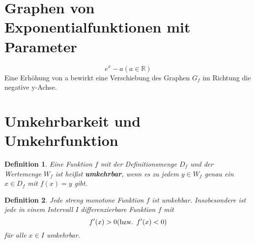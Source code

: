 \documentclass{book}
\newtheorem{definition}{Definition}
\begin{document}
\section{Graphen von Exponentialfunktionen mit Parameter}
\[e^x - a (a\in \mathbb{R})\]
Eine Erhöhung von a bewirkt eine Verschiebung des Graphen $G_f$ im Richtung die negative y-Achse.

\section{Umkehrbarkeit und Umkehrfunktion}

\begin{definition}
Eine Funktion $f$ mit der Definitionsmenge $D_f$ und der Wertemenge $W_f$ ist heißst \textbf{umkehrbar}, wenn es zu jedem $ y \in W_f$ genau ein $x \in D_f$ mit $ f(x) = y$ gibt.
\end{definition}

\begin{definition}
Jede streng monotone Funktion $f$ ist umkehbar.
Insobesondere ist jede in einem Intervall $I$ differenzierbare Funktion $f$ mit \[f'(x) > 0\text{(bzw. $ f'(x) < 0$)}\] für alle $x \in I $ umkehrbar.
\end{definition}
\end{document}
